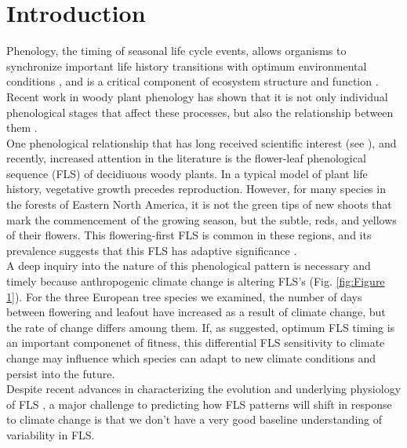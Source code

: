 \documentclass[12pt]{article}\usepackage[]{graphicx}\usepackage[]{color}
\begin{document}


\section*{Introduction}
\indent \indent Phenology, the timing of seasonal life cycle events, allows organisms to synchronize important life history transitions with optimum environmental conditions \citep{Forrest2010}, and is a critical component of ecosystem structure and function \citep{Cleland2007,Piao2007}. Recent work in woody plant phenology has shown that it is not only individual phenological stages that affect these processes, but also the relationship between them \citep{Ettinger2018}.\\
\indent One phenological relationship that has long received scientific interest (see \citet{Robertson1895}), and recently, increased attention in the literature is the flower-leaf phenological sequence (FLS) of decidiuous woody plants. In a typical model of plant life history, vegetative growth precedes reproduction. However, for many species in the forests of Eastern North America, it is not the green tips of new shoots that mark the commencement of the growing season, but the subtle, reds, and yellows of their flowers. This flowering-first FLS is common in these regions, and its prevalence suggests that this FLS has adaptive significance \citep{Rathcke_1985}.\\ 
\indent A deep inquiry into the nature of this phenological pattern is necessary and timely because anthropogenic climate change is altering FLS's (Fig. \ref{fig:Figure 1}). For the three European tree species we examined, the number of days between flowering and leafout have increased as a result of climate change, but the rate of change differs amoung them. %
If, as suggested, optimum FLS timing is an important componenet of fitness, this differential FLS sensitivity to climate change may influence which species can adapt to new climate conditions and persist into the future.\\
\indent Despite recent advances in characterizing the evolution and underlying physiology of FLS \citep{Gougherty2018,Savage2019}, a major challenge to predicting how FLS patterns will shift in response to climate change is that we don't have a very good baseline understanding of variability in FLS.
\end{document}
